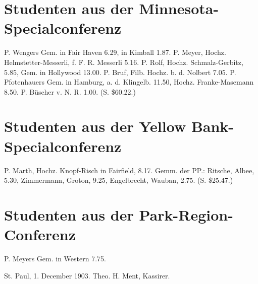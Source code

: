 \section{Studenten aus der Minnesota-Specialconferenz}
P. Wengers Gem. in Fair Haven 6.29, in Kimball 1.87. P. Meyer, Hochz. Helmstetter-Messerli, f. F. R. Messerli 5.16. P. Rolf, Hochz. Schmalz-Gerbitz, 5.85, Gem. in Hollywood 13.00. P. Bruf, Filb. Hochz. b. d. Nolbert 7.05. P. Pfotenhauers Gem. in Hamburg, a. d. Klingelb. 11.50, Hochz. Franke-Masemann 8.50. P. Büscher v. N. R. 1.00. (S. \$60.22.)

\section{Studenten aus der Yellow Bank-Specialconferenz}
P. Marth, Hochz. Knopf-Risch in Fairfield, 8.17. Gemm. der PP.: Ritsche, Albee, 5.30, Zimmermann, Groton, 9.25, Engelbrecht, Wauban, 2.75. (S. \$25.47.)

\section{Studenten aus der Park-Region-Conferenz}
P. Meyers Gem. in Western 7.75.

St. Paul, 1. December 1903. Theo. H. Ment, Kassirer.
